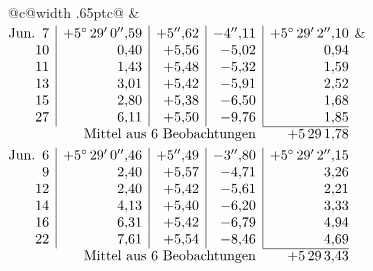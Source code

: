 \noindent\begin{tabular}{@{}c@{\hspace{.4em}\vrule width .65pt\hspace{.4em}}c@{}}
 &
 \\[.18ex]
\(\begin{array}[t]{@{}r|r|r|r|r@{}}
\text{Jun.}\enspace 7 & +5^\circ\,29'\,0''{,}59 & +5''{,}62 & -4''{,}11 & +5^\circ\,29'\,2''{,}10\\
10 & 0{,}40 & +5{,}56 & -5{,}02 & 0{,}94\\
11 & 1{,}43 & +5{,}48 & -5{,}32 & 1{,}59\\
13 & 3{,}01 & +5{,}42 & -5{,}91 & 2{,}52\\
15 & 2{,}80 & +5{,}38 & -6{,}50 & 1{,}68\\
27 & 6{,}11 & +5{,}50 & -9{,}76 & 1{,}85\\
\cline{5-5}
\multicolumn{4}{r}{\text{Mittel aus 6 Beobachtungen}} & +5\,29\,1{,}78
\end{array}\)
&
\(\begin{array}[t]{@{}r|r|r|r|r@{}}
\text{Jun.}\enspace 6 & +5^\circ\,29'\,0''{,}46 & +5''{,}49 & -3''{,}80 & +5^\circ\,29'\,2''{,}15\\
9 & 2{,}40 & +5{,}57 & -4{,}71 & 3{,}26\\
12 & 2{,}40 & +5{,}42 & -5{,}61 & 2{,}21\\
14 & 4{,}13 & +5{,}40 & -6{,}20 & 3{,}33\\
16 & 6{,}31 & +5{,}42 & -6{,}79 & 4{,}94\\
22 & 7{,}61 & +5{,}54 & -8{,}46 & 4{,}69\\
\cline{5-5}
\multicolumn{4}{r}{\text{Mittel aus 6 Beobachtungen}} & +5\,29\,3{,}43
\end{array}\)
\end{tabular}\par\medskip

\par
\endgroup

